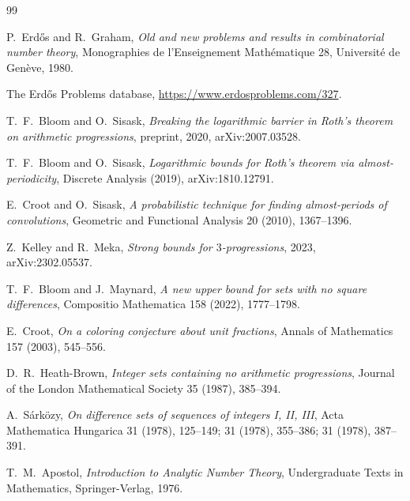 \documentclass[11pt]{amsart}
\theoremstyle{plain}
\theoremstyle{definition}
\begin{document}

\begin{thebibliography}{99}

P.\ Erd\H{o}s and R.\ Graham,
\emph{Old and new problems and results in combinatorial number theory},
Monographies de l'Enseignement Math\'ematique 28, Universit\'e de Gen\`eve, 1980.

The Erd\H{o}s Problems database,
\url{https://www.erdosproblems.com/327}.

T.\ F.\ Bloom and O.\ Sisask,
\emph{Breaking the logarithmic barrier in Roth's theorem on arithmetic progressions},
preprint, 2020, arXiv:2007.03528.

T.\ F.\ Bloom and O.\ Sisask,
\emph{Logarithmic bounds for Roth's theorem via almost-periodicity},
Discrete Analysis (2019), arXiv:1810.12791.

E.\ Croot and O.\ Sisask,
\emph{A probabilistic technique for finding almost-periods of convolutions},
Geometric and Functional Analysis 20 (2010), 1367--1396.

Z.\ Kelley and R.\ Meka,
\emph{Strong bounds for $3$-progressions},
2023, arXiv:2302.05537.

T.\ F.\ Bloom and J.\ Maynard,
\emph{A new upper bound for sets with no square differences},
Compositio Mathematica 158 (2022), 1777--1798.

E.\ Croot,
\emph{On a coloring conjecture about unit fractions},
Annals of Mathematics 157 (2003), 545--556.

D.\ R.\ Heath-Brown,
\emph{Integer sets containing no arithmetic progressions},
Journal of the London Mathematical Society 35 (1987), 385--394.

A.\ S\'ark\"ozy,
\emph{On difference sets of sequences of integers I, II, III},
Acta Mathematica Hungarica 31 (1978), 125--149; 31 (1978), 355--386; 31 (1978), 387--391.

T.\ M.\ Apostol,
\emph{Introduction to Analytic Number Theory},
Undergraduate Texts in Mathematics, Springer-Verlag, 1976.

\end{thebibliography}
\end{document}
